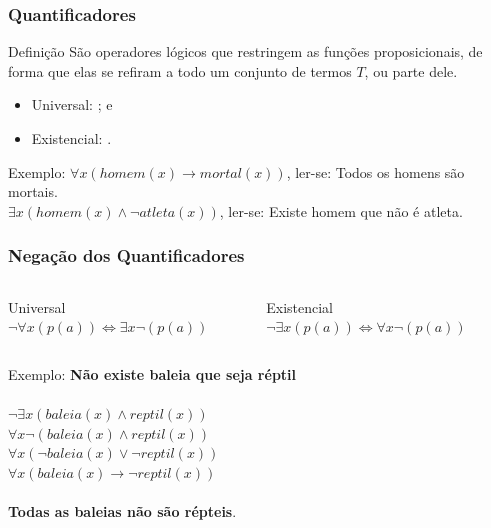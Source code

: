\documentclass{beamer}
\begin{document}
\begin{frame}
\frametitle{Quantificadores}

\begin{block}{Definição}
São operadores lógicos que restringem as funções proposicionais, de forma que elas se refiram a todo um conjunto de termos $T$, ou parte dele.
\end{block}\vfill

\begin{itemize}
	\item Universal: \structure{$\forall$}; e
	\item Existencial: \structure{$\exists$}.
\end{itemize}\vfill

\begin{exampleblock}{Exemplo:}
$\forall x(homem(x) \rightarrow mortal(x))$, ler-se: Todos os homens são mortais.\\
$\exists x(homem(x) \wedge \neg atleta(x))$, ler-se: Existe homem que não é atleta.
\end{exampleblock}
\end{frame}

\begin{frame}
\frametitle{Negação dos Quantificadores}

\begin{columns}[c]
	\large
	\begin{block}{Universal}
		$\neg \forall x(p(a)) \Leftrightarrow \exists x \neg (p(a))$
	\end{block}
	
	\begin{block}{Existencial}
		$\neg \exists x(p(a)) \Leftrightarrow \forall x \neg(p(a))$
	\end{block}
\end{columns}\vfill

\begin{exampleblock}{Exemplo:}
	\textbf{Não existe baleia que seja réptil}\\~\\
	
	$\neg \exists x(baleia(x) \wedge reptil(x))$ \\
	$\forall x \neg(baleia(x) \wedge reptil(x))$ \\
	$\forall x(\neg baleia(x) \vee \neg reptil(x))$ \\
	$\forall x(baleia(x) \rightarrow \neg reptil(x))$ \\~\\
	
	\textbf{Todas as baleias não são répteis}.
\end{exampleblock}
\end{frame}
\end{document}
